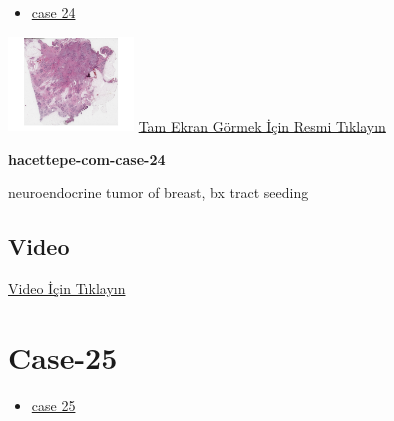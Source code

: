 \documentclass[
  letterpaper,
  DIV=11,
  numbers=noendperiod]{scrreprt}
\providecommand{\tightlist}{%
  \setlength{\itemsep}{0pt}\setlength{\parskip}{0pt}}\usepackage{longtable,booktabs,array}
\begin{document}
\begin{itemize}
\tightlist
\item
  \href{https://www.youtube.com/watch?v=-S0_Hr6sNZ8\&ab_channel=KemalKosemehmetoglu}{case
  24}
\end{itemize}

\href{https://images.patolojiatlasi.com/hacettepe-com-case-24/HE.html}{\includegraphics[width=0.25\textwidth,height=\textheight]{./screenshots/thumbnail_hacettepe-com-case-24.png}}
\href{https://images.patolojiatlasi.com/hacettepe-com-case-24/HE.html}{Tam
Ekran Görmek İçin Resmi Tıklayın}

\textbf{hacettepe-com-case-24}

\begin{tcolorbox}[enhanced jigsaw, colbacktitle=quarto-callout-tip-color!10!white, colback=white, titlerule=0mm, opacityback=0, colframe=quarto-callout-tip-color-frame, opacitybacktitle=0.6, bottomrule=.15mm, breakable, coltitle=black, title=\textcolor{quarto-callout-tip-color}{\faLightbulb}\hspace{0.5em}{Tanı}, toprule=.15mm, toptitle=1mm, bottomtitle=1mm, arc=.35mm, rightrule=.15mm, leftrule=.75mm, left=2mm]

neuroendocrine tumor of breast, bx tract seeding

\end{tcolorbox}

\hypertarget{video-22}{%
\subsection{Video}\label{video-22}}

\href{https://www.youtube.com/watch?v=-S0_Hr6sNZ8}{Video İçin Tıklayın}

\hypertarget{sec-hacettepe-case-of-the-month-case-25}{%
\section{Case-25}\label{sec-hacettepe-case-of-the-month-case-25}}

\begin{itemize}
\tightlist
\item
  \href{https://www.youtube.com/watch?v=tcmQKs38A14\&ab_channel=KemalKosemehmetoglu}{case
  25}
\end{itemize}
\end{document}
